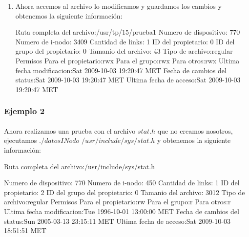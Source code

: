 \begin{enumerate}
\item Ahora accemos al archivo lo modificamos y guardamos los cambios y obtenemos la siguiente informaci\'on:
\begin{scriptsize} 
\begin{verbatimtab} 
Ruta completa del archivo:/usr/tp/15/prueba1
Numero de dispositivo: 770
Numero de i-nodo: 3409
Cantidad de links: 1
ID del propietario: 0
ID del grupo del propietario: 0
Tamanio del archivo: 43
Tipo de archivo:regular
Permisos
	 Para el propietario:rwx
	 Para el grupo:rwx
	 Para otros:rwx
Ultima fecha modificacion:Sat 2009-10-03 19:20:47 MET
Fecha de cambios del status:Sat 2009-10-03 19:20:47 MET
Ultima fecha de acceso:Sat 2009-10-03 19:20:47 MET
\end{verbatimtab} 
\end{scriptsize} 

\end{enumerate}

\subsubsection{Ejemplo 2}

\paragraph{} Ahora realizamos una prueba con el archivo $stat.h$ que no creamos nosotros, ejecutamos $./datosINodo$ $/usr/include/sys/stat.h$ y obtenemos la siguiente informaci\'on:

\begin{scriptsize} 
\begin{verbatimtab} 
Ruta completa del archivo:/usr/include/sys/stat.h

Numero de dispositivo: 770
Numero de i-nodo: 450
Cantidad de links: 1
ID del propietario: 2
ID del grupo del propietario: 0
Tamanio del archivo: 3012
Tipo de archivo:regular
Permisos
	 Para el propietario:rw
	 Para el grupo:r
	 Para otros:r
Ultima fecha modificacion:Tue 1996-10-01 13:00:00 MET
Fecha de cambios del status:Sun 2005-03-13 23:15:11 MET
Ultima fecha de acceso:Sat 2009-10-03 18:51:51 MET
\end{verbatimtab} 
\end{scriptsize} 
